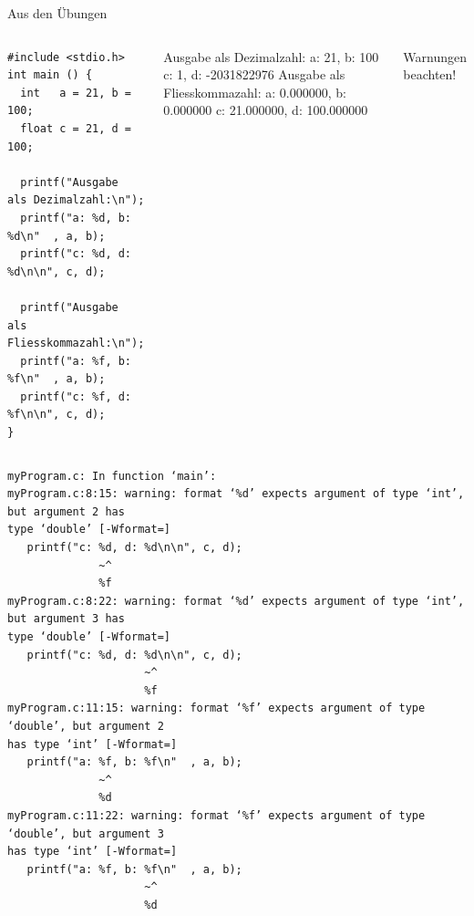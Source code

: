 \begin{frame}[fragile]{Aus den Übungen}
%
\begin{columns}[T]
\begin{codebox}
\begin{verbatim}
#include <stdio.h>
int main () {
  int   a = 21, b = 100;
  float c = 21, d = 100;
  
  printf("Ausgabe als Dezimalzahl:\n");
  printf("a: %d, b: %d\n"  , a, b);
  printf("c: %d, d: %d\n\n", c, d);
  
  printf("Ausgabe als Fliesskommazahl:\n");
  printf("a: %f, b: %f\n"  , a, b);
  printf("c: %f, d: %f\n\n", c, d);
}
\end{verbatim}
\end{codebox}
%
\begin{cmdbox}[Ausgabe]
\ttfamily\scriptsize
Ausgabe als Dezimalzahl:\newline
a: 21, b: 100\newline
c: 1, d: -2031822976\newline
\newline
Ausgabe als Fliesskommazahl:\newline
a: 0.000000, b: 0.000000\newline
c: 21.000000, d: 100.000000
\end{cmdbox}
%
\begin{hintbox}
Warnungen beachten!
\end{hintbox}
\end{columns}
%
\end{frame}


\begin{frame}[fragile]
%
\begin{cmdbox}
\begin{verbatim}
myProgram.c: In function ‘main’:
myProgram.c:8:15: warning: format ‘%d’ expects argument of type ‘int’, but argument 2 has 
type ‘double’ [-Wformat=]
   printf("c: %d, d: %d\n\n", c, d);
              ~^
              %f
myProgram.c:8:22: warning: format ‘%d’ expects argument of type ‘int’, but argument 3 has 
type ‘double’ [-Wformat=]
   printf("c: %d, d: %d\n\n", c, d);
                     ~^
                     %f
myProgram.c:11:15: warning: format ‘%f’ expects argument of type ‘double’, but argument 2 
has type ‘int’ [-Wformat=]
   printf("a: %f, b: %f\n"  , a, b);
              ~^
              %d
myProgram.c:11:22: warning: format ‘%f’ expects argument of type ‘double’, but argument 3 
has type ‘int’ [-Wformat=]
   printf("a: %f, b: %f\n"  , a, b);
                     ~^
                     %d
\end{verbatim}
\end{cmdbox}
%
\end{frame}

